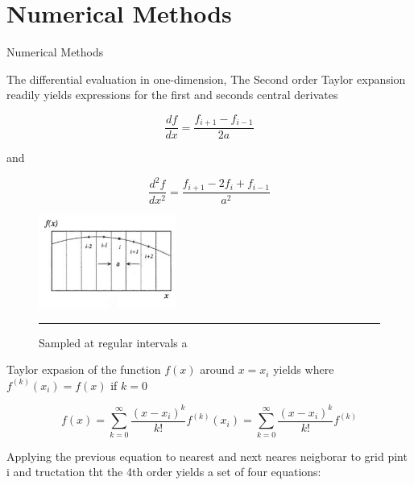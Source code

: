 \section{Numerical Methods}




Numerical Methods
\cite{methods}

The differential evaluation in one-dimension,
The Second order Taylor expansion readily yields expressions for the first and seconds central derivates

$$ \dfrac{df}{dx} = \dfrac{f_{i+1} - f_{i-1} }{2a}$$

and

$$ \dfrac{d^{2}f}{dx^{2}} = \dfrac{f_{i+1} - 2f_{i}+f_{i-1} }{a^2}$$

\begin{figure}[htbp]
	\centering
		\includegraphics[width=0.4\textwidth]{Figures/taylor.png}
		\rule{35em}{0.2pt}
	\caption[Sampled at regular intervals a, Taylor expansion]{Sampled at regular intervals a}
	\label{fig:taylor}
\end{figure}

Taylor expasion of the function $f(x)$ around $x=x_i$ yields where $f^{(k)}(x_i) = f(x)$ if $k=0$

$$f(x) = \sum\limits_{k=0}^{\infty} \dfrac{(x-x_i)^k}{k!}f^{(k)}(x_i) = \sum\limits_{k=0}^{\infty} \dfrac{(x-x_i)^k}{k!}f^{(k)}$$

Applying the previous equation to nearest and next neares neigborar to grid pint i and tructation tht the 4th order yields a set of four equations:

